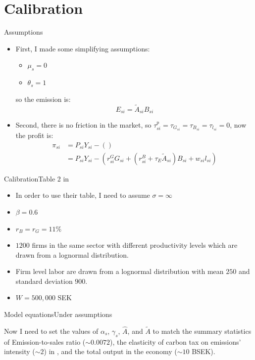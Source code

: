\documentclass[aspectratio=169]{beamer}
\begin{document}
\section{Calibration}
\begin{frame}{Assumptions}
	\begin{itemize}
		\item First, I made some simplifying assumptions:
		\begin{itemize}
			\item $\mu_s = 0$
			\item $\theta_s = 1$
		\end{itemize}
		so the emission is:
		\begin{equation*}
			E_{si} = \tilde{A}_{si}B_{si}
		\end{equation*}
		\item Second, there is no friction in the market, so $\tau_{si}^p = \tau_{G_{si}} = \tau_{B_{si}} = \tau_{l_{si}} = 0$, now the profit is:
		\begin{equation*}
			\begin{split}
				\pi_{si} &=  P_{si} Y_{si} - ()\\
				& = P_{si} Y_{si} - (r_{{si}}^GG_{si}  + (r_{{si}}^B + \tau_E\tilde{A}_{si})B_{si} +  w_{si}l_{si})
			\end{split}
		\end{equation*}
	\end{itemize}
\end{frame}
\begin{frame}{Calibration}{Table 2 in \cite{martinsson2024effect}}
	\begin{itemize}
		\item In order to use their table, I need to assume $\sigma = \infty$
		\item $\beta = 0.6$
		\item $r_B = r_G = 11\%$
		\item $1200$ firms in the same sector with different productivity levels which are drawn from a lognormal distribution.
		\item Firm level labor are drawn from a lognormal distribution with mean $250$ and standard deviation $900$.
		\item $W = 500,000$ SEK
	\end{itemize}
\end{frame}
\begin{frame}{Model equations}{Under assumptions}
	
	Now I need to set the values of $\alpha_s$, $\gamma_s$, ${\hat{A}}$, and ${\tilde{A}}$ to match the summary statistics of Emission-to-sales ratio ($\sim 0.0072$), the elasticity of carbon tax on emissions' intensity ($\sim 2$) in \cite{martinsson2024effect}, and the total output in the economy ($\sim 10$ BSEK).
\end{frame}
\end{document}
